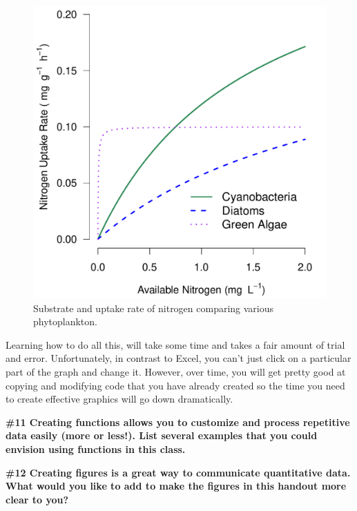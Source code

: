 \documentclass{tufte-handout}\usepackage[]{graphicx}\usepackage[]{xcolor}
\makeatletter
\def\maxwidth{ %
  \ifdim\Gin@nat@width>\linewidth
    \linewidth
  \else
    \Gin@nat@width
  \fi
}
\newenvironment{knitrout}{}{} %
\makeatother
\begin{document}
\begin{figure}
\caption{Substrate and uptake rate of nitrogen comparing various phytoplankton.}
\label{fig:michaelis}
\begin{knitrout}
\color{fgcolor}
\includegraphics[width=\maxwidth]{figure/unnamed-chunk-63-1} 
\end{knitrout}
\end{figure}


Learning how to do all this, will take some time and takes a fair amount of trial and error. Unfortunately, in contrast to Excel, you can't just click on a particular part of the graph and change it. However, over time, you will get pretty good at copying and modifying code that you have already created so the time you need to create effective graphics will go down dramatically.

\bigskip
\noindent \textbf{\#11 Creating functions allows you to customize and process repetitive data easily (more or less!). List several examples that you could envision using functions in this class. }

\bigskip
\noindent \textbf{\#12 Creating figures is a great way to communicate quantitative data. What would you like to add to make the figures in this handout more clear to you?}
\end{document}
